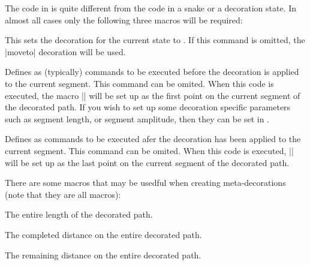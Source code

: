 \begin{command}{\pgfdeclaremetadecorate{}}
\begin{command}{\state{}}
    The code in  is quite different from the code in a 
    snake or a decoration state. In almost all cases only the 
    following three macros will be required:
    
    \begin{command}{\decoration{}}
    	This sets the decoration for the current state to .
    	If this command is omitted, the |moveto| decoration will be
    	used.
    \end{command}
    
    \begin{command}{\beforedecoration{}}
    	Defines  as (typically) \pgfname{} commands to be
    	executed before the decoration is applied to the current segment.
    	This command can be omited. When this code is executed,
    	the macro |\pgfpointmetadecoratedpathfirst| will be set up as
    	the first point on the current segment of the decorated path.
    	If you wish to set up some decoration specific parameters 
    	such as segment length, or segment amplitude, then they
    	can be set in .
    	
    \end{command}
    
    \begin{command}{\afterdecoration{}}
    	Defines  as commands to be	executed afer the 
    	decoration has been applied to the current segment.
    	This command can be omited.
    	When this code is executed, |\pgfpointmetadecoratedpathlast| will 
    	be set up as the last point on the current segment of the 
    	decorated path.
    \end{command}
    
    There are some macros that may be usedful when creating 
    meta-decorations (note that they are all macros):
    
    \begin{command}{\pgfmetadecoratedpathlength}
      The entire length of the decorated path.
    \end{command}
    
    
    \begin{command}{\pgfmetadecoratedcompleteddistance}
    	The completed distance on the entire decorated path.
    \end{command}
    
    \begin{command}{\pgfmetadecoratedremainingdistance}
    	The remaining distance on the entire decorated path.
    \end{command}
    

\end{command}
\end{command}
